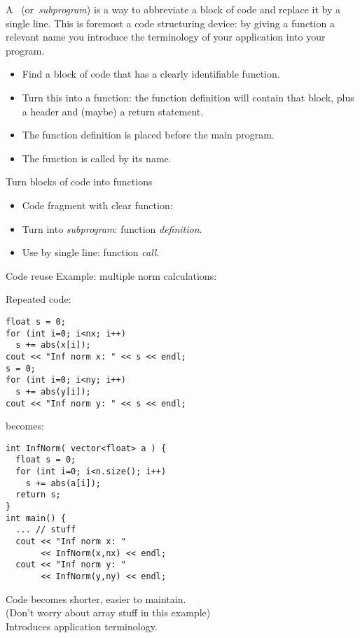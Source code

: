 
A~
(or~\emph{subprogram}) is a way to
abbreviate a block of code and replace it by a single line.
This is foremost a code structuring device: by giving a function a
relevant name you introduce the terminology of your application into
your program.

\begin{itemize}
\item Find a block of code that has a clearly identifiable function.
\item Turn this into a function: the function definition will contain
  that block, plus a header and (maybe) a return statement.
\item The function definition is placed before the main program.
\item The function is called by its name.
\end{itemize}

\begin{slide}{Turn blocks of code into functions}
  \label{sl:function-intro}
  \begin{itemize}
  \item Code fragment with clear function:
  \item Turn into \emph{subprogram}: function \emph{definition}.
  \item Use by single line: function \emph{call}.
  \end{itemize}
\end{slide}

\begin{block}{Code reuse}
  \label{sl:function-reuse}
Example: multiple norm calculations:
  \begin{multicols}{2}
    \small
    Repeated code:
\begin{verbatim}
float s = 0;
for (int i=0; i<nx; i++)
  s += abs(x[i]);
cout << "Inf norm x: " << s << endl;
s = 0;
for (int i=0; i<ny; i++)
  s += abs(y[i]);
cout << "Inf norm y: " << s << endl;
\end{verbatim}
\vfill\columnbreak
becomes:
\begin{verbatim}
int InfNorm( vector<float> a ) {
  float s = 0;
  for (int i=0; i<n.size(); i++)
    s += abs(a[i]);
  return s;
}
int main() {
  ... // stuff
  cout << "Inf norm x: "
       << InfNorm(x,nx) << endl;
  cout << "Inf norm y: " 
       << InfNorm(y,ny) << endl;
\end{verbatim}
  \end{multicols}
  Code becomes shorter, easier to maintain.\\
  (Don't worry about array stuff in this example)\\
  Introduces application terminology.
\end{block}

